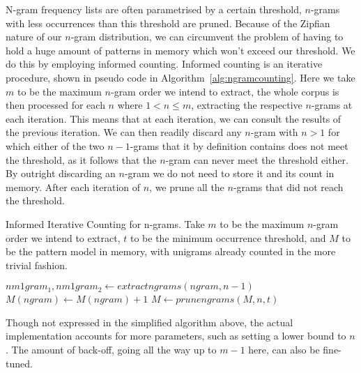 \documentclass[review]{elsarticle}
\begin{document}
N-gram frequency lists are often parametrised by a certain threshold, $n$-grams
with less occurrences than this threshold are pruned. Because of the Zipfian
nature of our $n$-gram distribution, we can circumvent the problem of having to
hold a huge amount of patterns in memory which won't exceed our threshold. We do this by
employing informed counting. Informed counting is an iterative procedure, shown
in pseudo code in Algorithm~\ref{alg:ngramcounting}. Here we take $m$ to be the maximum
$n$-gram order we intend to extract, the whole corpus is then processed for
each $n$ where $1<n\leq m$, extracting the respective $n$-grams at each
iteration. This means that at each iteration, we can consult the results of the
previous iteration. We can then readily discard any $n$-gram with $n>1$ for
which either of the two $n-1$-grams that it by definition contains does not
meet the threshold, as it follows that the $n$-gram can never meet the
threshold either. By outright discarding an $n$-gram we do not need to store it
and its count in memory. After each iteration of $n$, we prune all the
$n$-grams that did not reach the threshold.


\begin{algorithm} \caption{Informed Iterative Counting for n-grams.  Take $m$
to be the maximum $n$-gram order we intend to extract, $t$ to be the minimum occurrence threshold, and $M$ to be the
pattern model in memory, with unigrams already counted in the more trivial fashion.}
\label{alg:ngramcounting}
\begin{algorithmic}
            \State  $nm1gram_1, nm1gram_2 \leftarrow extractngrams(ngram,n-1)$
                \State $M(ngram) \leftarrow M(ngram) + 1$
            \EndIf
        \EndFor 
    \EndFor
    \State $M \leftarrow prunengrams(M,n,t)$
\EndFor \\
\end{algorithmic}
\end{algorithm}

Though not expressed in the simplified algorithm above, the actual
implementation accounts for more parameters, such as setting a lower bound to
$n$. The amount of back-off, going all the way up to $m-1$ here, can also be
fine-tuned.
\end{document}
